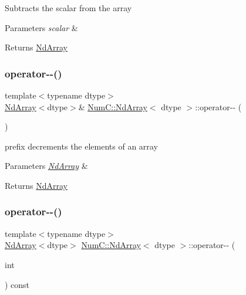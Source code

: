 Subtracts the scalar from the array


\begin{DoxyParams}{Parameters}
{\em scalar} & \\
\hline
\end{DoxyParams}
\begin{DoxyReturn}{Returns}
\mbox{\hyperlink{class_num_c_1_1_nd_array}{Nd\+Array}} 
\end{DoxyReturn}
\mbox{\label{class_num_c_1_1_nd_array_a3570e7df7c2202a6a8a5f5770f132ba3}} 
\subsubsection{\texorpdfstring{operator-\/-\/()}{operator--()}\hspace{0.1cm}{\footnotesize\ttfamily [1/2]}}
{\footnotesize\ttfamily template$<$typename dtype$>$ \\
\mbox{\hyperlink{class_num_c_1_1_nd_array}{Nd\+Array}}$<$dtype$>$\& \mbox{\hyperlink{class_num_c_1_1_nd_array}{Num\+C\+::\+Nd\+Array}}$<$ dtype $>$\+::operator-\/-\/ (\begin{DoxyParamCaption}{ }\end{DoxyParamCaption})\hspace{0.3cm}{\ttfamily [inline]}}

prefix decrements the elements of an array


\begin{DoxyParams}{Parameters}
{\em \mbox{\hyperlink{class_num_c_1_1_nd_array}{Nd\+Array}}} & \\
\hline
\end{DoxyParams}
\begin{DoxyReturn}{Returns}
\mbox{\hyperlink{class_num_c_1_1_nd_array}{Nd\+Array}} 
\end{DoxyReturn}
\mbox{\label{class_num_c_1_1_nd_array_ae2cf6f24f8c46ac4b7409b09ecc69b0f}} 
\subsubsection{\texorpdfstring{operator-\/-\/()}{operator--()}\hspace{0.1cm}{\footnotesize\ttfamily [2/2]}}
{\footnotesize\ttfamily template$<$typename dtype$>$ \\
\mbox{\hyperlink{class_num_c_1_1_nd_array}{Nd\+Array}}$<$dtype$>$ \mbox{\hyperlink{class_num_c_1_1_nd_array}{Num\+C\+::\+Nd\+Array}}$<$ dtype $>$\+::operator-\/-\/ (\begin{DoxyParamCaption}\item[{int}]{ }\end{DoxyParamCaption}) const\hspace{0.3cm}{\ttfamily [inline]}}

